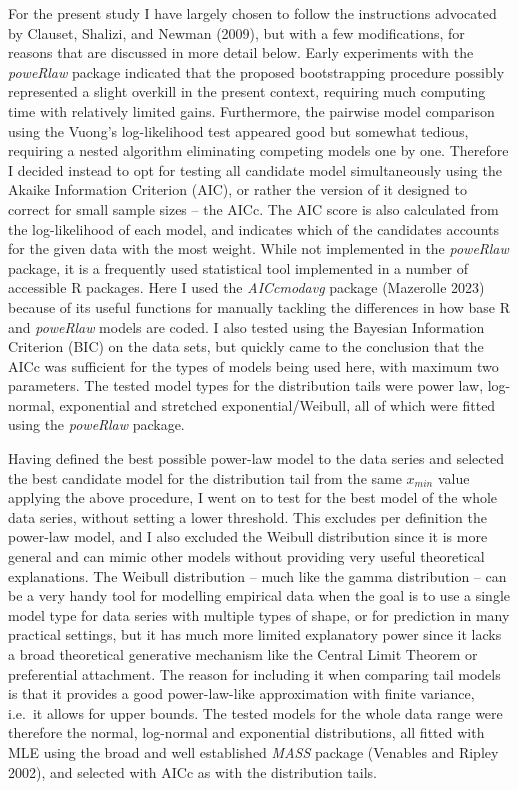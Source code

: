 \documentclass[
  12pt,
  a4paper, twoside]{book}
\begin{document}
For the present study I have largely chosen to follow the instructions advocated by Clauset, Shalizi, and Newman (2009), but with a few modifications, for reasons that are discussed in more detail below. Early experiments with the \emph{poweRlaw} package indicated that the proposed bootstrapping procedure possibly represented a slight overkill in the present context, requiring much computing time with relatively limited gains. Furthermore, the pairwise model comparison using the Vuong's log-likelihood test appeared good but somewhat tedious, requiring a nested algorithm eliminating competing models one by one. Therefore I decided instead to opt for testing all candidate model simultaneously using the Akaike Information Criterion (AIC), or rather the version of it designed to correct for small sample sizes -- the AICc. The AIC score is also calculated from the log-likelihood of each model, and indicates which of the candidates accounts for the given data with the most weight. While not implemented in the \emph{poweRlaw} package, it is a frequently used statistical tool implemented in a number of accessible R packages. Here I used the \emph{AICcmodavg} package (Mazerolle 2023) because of its useful functions for manually tackling the differences in how base R and \emph{poweRlaw} models are coded. I also tested using the Bayesian Information Criterion (BIC) on the data sets, but quickly came to the conclusion that the AICc was sufficient for the types of models being used here, with maximum two parameters. The tested model types for the distribution tails were power law, log-normal, exponential and stretched exponential/Weibull, all of which were fitted using the \emph{poweRlaw} package.

Having defined the best possible power-law model to the data series and selected the best candidate model for the distribution tail from the same \(x_{min}\) value applying the above procedure, I went on to test for the best model of the whole data series, without setting a lower threshold. This excludes per definition the power-law model, and I also excluded the Weibull distribution since it is more general and can mimic other models without providing very useful theoretical explanations. The Weibull distribution -- much like the gamma distribution -- can be a very handy tool for modelling empirical data when the goal is to use a single model type for data series with multiple types of shape, or for prediction in many practical settings, but it has much more limited explanatory power since it lacks a broad theoretical generative mechanism like the Central Limit Theorem or preferential attachment. The reason for including it when comparing tail models is that it provides a good power-law-like approximation with finite variance, i.e.~it allows for upper bounds. The tested models for the whole data range were therefore the normal, log-normal and exponential distributions, all fitted with MLE using the broad and well established \emph{MASS} package (Venables and Ripley 2002), and selected with AICc as with the distribution tails.
\end{document}
